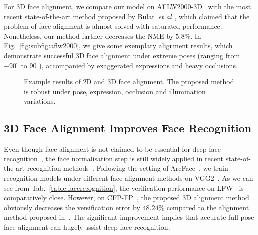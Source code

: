 \documentclass{bmvc2k}
\def\etal{\emph{et al}\bmvaOneDot}
\begin{document}
For 3D face alignment, we compare our model on AFLW2000-3D~\cite{zhu2016face} with the most recent state-of-the-art method proposed by Bulat~\etal~\cite{bulat2017binarized}, which claimed that the problem of face alignment is almost solved with saturated performance. Nonetheless, our method further decreases the NME by $5.8\%$. In Fig.~\ref{fig:subfig:aflw2000}, we give some exemplary alignment results, which demonstrate successful 3D face alignment under extreme poses (ranging from $-90^\circ$ to $90^\circ$), accompanied by exaggerated expressions and heavy occlusions. 

\begin{figure*}[h!]
\centering
\vspace{-2mm}
\vspace{-2mm}
\vspace{-2mm}
\vspace{-2mm}
\vspace{-2mm}
\vspace{-2mm}
\caption{Example results of 2D and 3D face alignment. The proposed method is robust under pose, expression, occlusion and illumination variations.}
\vspace{-2mm}
\label{fig:examples}
\end{figure*}

\subsection{3D Face Alignment Improves Face Recognition}

Even though face alignment is not claimed to be essential for deep face recognition~\cite{schroff2015facenet,deng2017marginal,deng2017uv,deng2018arcface}, the face normalisation step is still widely applied in recent state-of-the-art recognition methods~\cite{deng2018arcface}. Following the setting of ArcFace~\cite{deng2018arcface}, we train recognition models under different face alignment methods on VGG2~\cite{cao2017vggface2}. As we can see from Tab.~\ref{table:facerecognition}, the verification performance on LFW~\cite{huang2007labeled} is comparatively close. However, on CFP-FP~\cite{sengupta2016frontal}, the proposed 3D alignment method obviously decreases the versification error by $48.24\%$ compared to the alignment method proposed in~\cite{zhang2016joint}. The significant improvement implies that accurate full-pose face alignment can hugely assist deep face recognition.
\end{document}
